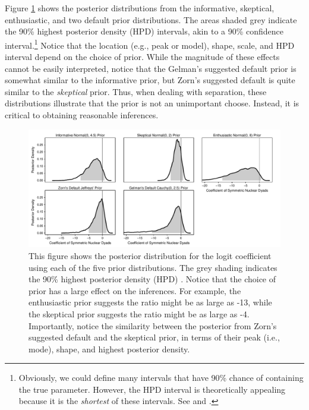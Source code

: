 \documentclass[12pt]{article}
\begin{document}
Figure \ref{fig:bm-posterior-density} shows the posterior distributions from the informative, skeptical, enthusiastic, and two default prior distributions. The areas shaded grey indicate the 90\% highest posterior density (HPD) intervals, akin to a 90\% confidence interval.\footnote{Obviously, we could define many intervals that have 90\% chance of containing the true parameter. However, the HPD interval is theoretically appealing because it is the \emph{shortest} of these intervals. See \citet[esp. pp. 48-51]{Gill2008} and \citet[esp. p. 448]{CasellaBerger2003}.} Notice that the location (e.g., peak or model), shape, scale, and HPD interval depend on the choice of prior. While the magnitude of these effects cannot be easily interpreted, notice that the Gelman's suggested default prior is somewhat similar to the informative prior, but Zorn's suggested default is quite similar to the \emph{skeptical} prior. Thus, when dealing with separation, these distributions illustrate that the prior is not an unimportant choose. Instead, it is critical to obtaining reasonable inferences.

\begin{figure}[H]
\begin{center}
\includegraphics[scale = .8]{figs/bm-posterior-density.pdf}
\caption{This figure shows the posterior distribution for the logit coefficient using each of the five prior distributions.  The grey shading indicates the 90\% highest posterior density (HPD) . Notice that the choice of prior has a large effect on the inferences. For example, the enthusiastic prior suggests the ratio might be as large as -13, while the skeptical prior suggests the ratio might be as large as -4. Importantly, notice the similarity between the posterior from Zorn's suggested default and the skeptical prior, in terms of their peak (i.e., mode), shape, and highest posterior density.}\label{fig:bm-posterior-density}
\end{center}
\end{figure}
\end{document}

